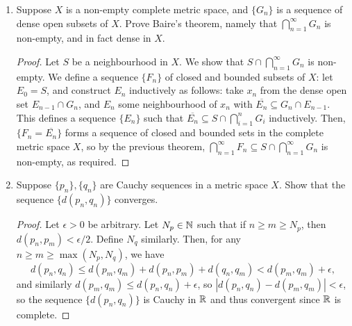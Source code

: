\begin{enumerate}
\begin{proof}
Let $p_n \in E_n$. Then $\{p_n, p_{n+1}, \dotsc\} \subseteq E_n$ so $\diam \{p_n, p_{n+1}, \dotsc\} \to 0$, ie. $\{p_n\}$ is Cauchy. Since $X$ is complete, $p_n \to p$ for some $p \in X$. But now for any $n$, the sequence $\{p_n, p_{n+1}, \dotsc\}$ converges to $p \in E_n$ since $E_n$ is closed. Thus, $p \in \bigcap_{n=1}^{\infty} E_n$. Now $p$ must be the unique point in $\bigcap_{n=1}^{\infty} E_n$ otherwise the diameters of $E_n$ would not fall below some positive real value.
\end{proof}

\item %
Suppose $X$ is a non-empty complete metric space, and $\{G_n\}$ is a sequence of dense open subsets of $X$. Prove Baire's theorem, namely that $\bigcap_{n=1}^{\infty} G_n$ is non-empty, and in fact dense in $X$.

\begin{proof}
    Let $S$ be a neighbourhood in $X$. We show that $S \cap \bigcap_{n=1}^{\infty} G_n$ is non-empty. We define a sequence $\{F_n\}$ of closed and bounded subsets of $X$: let $E_0 = S$, and construct $E_n$ inductively as follows: take $x_n$ from the dense open set $E_{n-1} \cap G_n$, and $E_n$ some neighbourhood of $x_n$ with $\overline{E_n} \subseteq G_n \cap E_{n-1}$. This defines a sequence $\{E_n\}$ such that $\overline{E_n} \subseteq S \cap \bigcap_{i=1}^{n} G_i$ inductively. Then, $\{F_n = \overline{E_n}\}$ forms a sequence of closed and bounded sets in the complete metric space $X$, so by the previous theorem, $\bigcap_{n=1}^{\infty} F_n \subseteq S \cap \bigcap_{n=1}^{\infty} G_n$ is non-empty, as required.
\end{proof}

\item %
Suppose $\{p_n\}, \{q_n\}$ are Cauchy sequences in a metric space $X$. Show that the sequence $\{d(p_n, q_n)\}$ converges.

\begin{proof}
    Let $\epsilon > 0$ be arbitrary. Let $N_p \in \mathbb{N}$ such that if $n \ge m \ge N_p$, then $d(p_n, p_m) < \epsilon / 2$. Define $N_q$ similarly. Then, for any $n \ge m \ge \max(N_p, N_q)$, we have
    \[
        d(p_n, q_n) \le d(p_m, q_m) + d(p_n, p_m) + d(q_n, q_m) < d(p_m, q_m) + \epsilon,
    \]
    and similarly $d(p_m, q_m) \le d(p_n, q_n) + \epsilon$, so $|d(p_n, q_n) - d(p_m, q_m)| < \epsilon$, so the sequence $\{d(p_n, q_n)\}$ is Cauchy in $\mathbb{R}$ and thus convergent since $\mathbb{R}$ is complete. 
\end{proof}


\end{enumerate}

